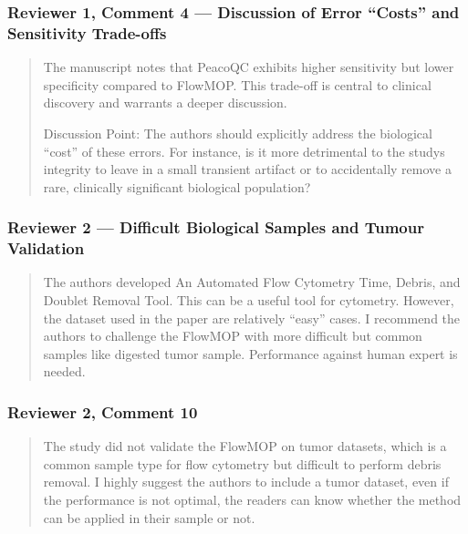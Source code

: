 \documentclass[
  11pt,
  a4paper,
]{article}
\begin{document}
\subsubsection{Reviewer 1, Comment 4 --- Discussion of Error ``Costs''
and Sensitivity
Trade-offs}\label{reviewer-1-comment-4--discussion-of-error-costs-and-sensitivity-trade-offs}

\begin{quote}
The manuscript notes that PeacoQC exhibits higher sensitivity but lower
specificity compared to FlowMOP. This trade-off is central to clinical
discovery and warrants a deeper discussion.

Discussion Point: The authors should explicitly address the biological
``cost'' of these errors. For instance, is it more detrimental to the
study\textquotesingle s integrity to leave in a small transient artifact
or to accidentally remove a rare, clinically significant biological
population?
\end{quote}

\subsubsection{Reviewer 2 --- Difficult Biological Samples and Tumour
Validation}\label{reviewer-2--difficult-biological-samples-and-tumour-validation}

\begin{quote}
The authors developed An Automated Flow Cytometry Time, Debris, and
Doublet Removal Tool. This can be a useful tool for cytometry. However,
the dataset used in the paper are relatively ``easy'' cases. I recommend
the authors to challenge the FlowMOP with more difficult but common
samples like digested tumor sample. Performance against human expert is
needed.
\end{quote}

\subsubsection{Reviewer 2, Comment 10}\label{reviewer-2-comment-10}

\begin{quote}
The study did not validate the FlowMOP on tumor datasets, which is a
common sample type for flow cytometry but difficult to perform debris
removal. I highly suggest the authors to include a tumor dataset, even
if the performance is not optimal, the readers can know whether the
method can be applied in their sample or not.
\end{quote}
\end{document}
